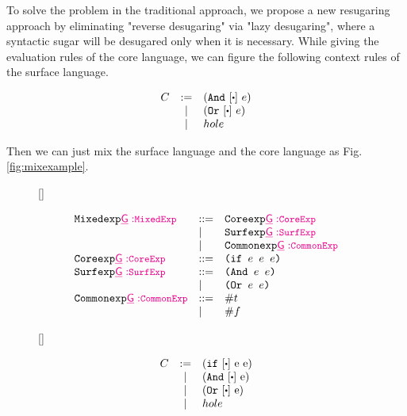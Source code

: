 To solve the problem in the traditional approach, we propose a new resugaring approach by eliminating "reverse desugaring" via "lazy desugaring", where a syntactic sugar will be desugared only when it is necessary. While giving the evaluation rules of the core language, we can figure the following context rules of the surface language.

\[
\begin{array}{lcl}
C &:=& (\m{And}~[\bigcdot]~e)\\
&|& (\m{Or}~[\bigcdot]~e)\\
&|&hole\\
\end{array}
\]

Then we can just mix the surface language and the core language as Fig. \ref{fig:mixexample}.

\begin{figure}[thb]
\centering
{}[\linewidth]{
\begin{flushleft}
\[
\begin{array}{lll}
\mbox{\tt Mixedexp}{\small\color{magenta}\underline{\sf{G}}:} {\color{magenta}{\small \mbox{\tt MixedExp}}} &::=& \mbox{\tt Coreexp}{\small\color{magenta}\underline{\sf{G}}:} {\color{magenta}{\small \mbox{\tt CoreExp}}} \\
&|&\mbox{\tt Surfexp}{\small\color{magenta}\underline{\sf{G}}:} {\color{magenta}{\small \mbox{\tt SurfExp}}}\\
&|&\mbox{\tt Commonexp}{\small\color{magenta}\underline{\sf{G}}:} {\color{magenta}{\small \mbox{\tt CommonExp}}}\\
\mbox{\tt Coreexp}{\small\color{magenta}\underline{\sf{G}}:} {\color{magenta}{\small \mbox{\tt CoreExp}}} &::=& \texttt{(if~$e$~$e$~$e$)}\\
\mbox{\tt Surfexp}{\small\color{magenta}\underline{\sf{G}}:} {\color{magenta}{\small \mbox{\tt SurfExp}}} &::=& \texttt{(And~$e$~$e$)}\\
&|&\texttt{(Or~$e$~$e$)}\\
\mbox{\tt Commonexp}{\small\color{magenta}\underline{\sf{G}}:} {\color{magenta}{\small \mbox{\tt CommonExp}}} &::=& \#t\\
&|& \#f\\
\end{array}
\]
\end{flushleft}

}
[\linewidth]{
\begin{flushleft}
\[
\begin{array}{lcl}
C &:=& (\m{if}~[\bigcdot]~$e$~$e$)\\
&|& (\m{And}~[\bigcdot]~$e$)\\
&|& (\m{Or}~[\bigcdot]~$e$)\\
&|&hole\\
\end{array}
\]
\end{flushleft}

}


\end{figure}
